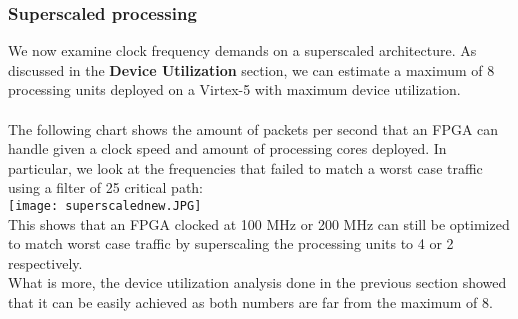 \documentclass{l4proj}
\begin{document}
\subsubsection{Superscaled processing}
We now examine clock frequency demands on a superscaled architecture. As discussed in the \textbf{Device Utilization} section, we can estimate a maximum of 8 processing units deployed on a Virtex-5 with maximum device utilization.\\\\
The following chart shows the amount of packets per second that an FPGA can handle given a clock speed and amount of processing cores deployed. In particular, we look at the frequencies that failed to match a worst case traffic using a filter of 25 critical path:\\
\texttt{[image: superscalednew.JPG]}\\
This shows that an FPGA clocked at 100 MHz or 200 MHz can still be optimized to match worst case traffic by superscaling the processing units to 4 or 2 respectively.\\
What is more, the device utilization analysis done in the previous section showed that it can be easily achieved as both numbers are far from the maximum of 8.
\end{document}
